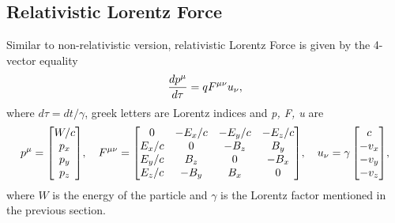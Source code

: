 \documentclass[a4paper,oneside,12pt]{report}
\numberwithin{equation}{chapter}
\begin{document}
\subsection{Relativistic Lorentz Force}
Similar to non-relativistic version, relativistic Lorentz Force is given by the 4-vector equality
\vspace{-11pt}
\begin{equation}
    \frac{d p^{\mu}}{d \tau} = q F^{\mu \nu} u_{\nu} ,
    \vspace{-11pt}
\end{equation}
where $ d \tau = d t / \gamma $, greek letters are Lorentz indices and \textit{p, F, u} are
\vspace{-10pt}
\begin{equation}
    \begin{aligned}
        p^{\mu} = 
        \begin{bmatrix}
            W/c \\
            p_x \\
            p_y \\
            p_z
        \end{bmatrix}    
    \end{aligned} ,
    \quad
    \begin{aligned}
        F^{\mu\nu} = 
        \begin{bmatrix}
                0       & -E_x/c   & -E_y/c    & -E_z/c \\
                E_x/c   &   0      & -B_z      & B_y    \\
                E_y/c   &   B_z    &  0        & -B_x   \\
                E_z/c   &   -B_y   & B_x       & 0   
        \end{bmatrix} 
    \end{aligned} ,
    \quad
    \begin{aligned}
        u_{\nu} = \gamma
        \begin{bmatrix}
                 c \\
                -v_x \\
                -v_y \\
                -v_z \\
        \end{bmatrix} 
    \end{aligned} ,
    \vspace{-10pt}
\end{equation}
where $W$ is the energy of the particle and $\gamma$ is the Lorentz factor mentioned in the previous section.
\end{document}
